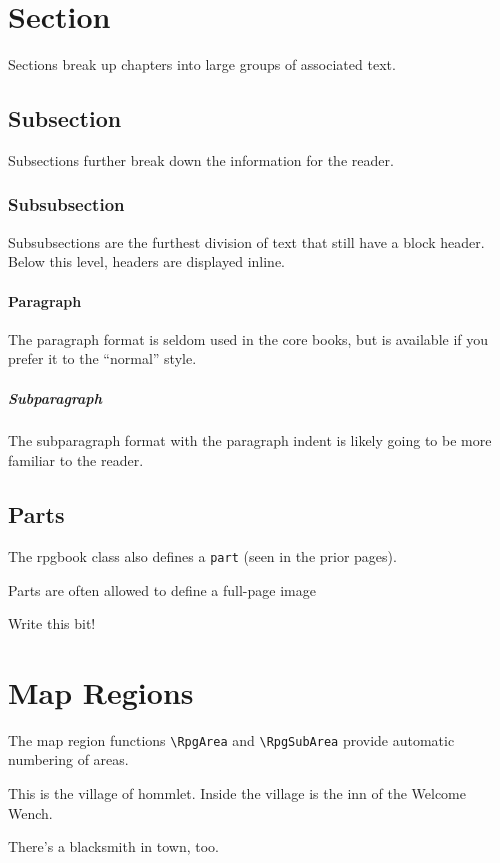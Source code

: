 		\section{Section}
			Sections break up chapters into large groups of associated text.

			\subsection{Subsection}
				Subsections further break down the information for the reader.

				\subsubsection{Subsubsection}
					Subsubsections are the furthest division of text that still have a block header. Below this level, headers are displayed inline.

					\paragraph{Paragraph}
					The paragraph format is seldom used in the core books, but is available if you prefer it to the ``normal'' style.

					\subparagraph{Subparagraph}
					The subparagraph format with the paragraph indent is likely going to be more familiar to the reader.
			\subsection{Parts}

				The rpgbook class also defines a \verb|part| (seen in the prior pages).

				Parts are often allowed to define a full-page image

				{\color{red} Write this bit!}
		\section{Map Regions}
			The map region functions \verb|\RpgArea| and \verb|\RpgSubArea| provide automatic numbering of areas.


			\RpgSetAreaOptions[area-label=village,area-num-depth=3]{}
			This is the village of hommlet.
			\RpgSetAreaOptions[area-label=villages,area-num-depth=3]{}
			Inside the village is the inn of the Welcome Wench.

			There's a blacksmith in town, too.

